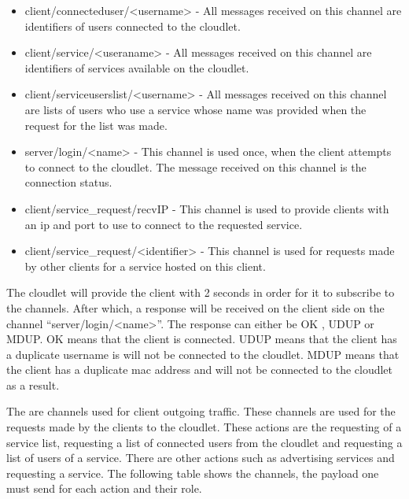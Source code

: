 \begin{itemize}
\itemsep0em
\item client/connecteduser/<username> - All messages received on this channel are identifiers of users connected to the cloudlet.
\item client/service/<useraname> -  All messages received on this channel are identifiers of services available on the cloudlet.
\item client/serviceuserslist/<username> -  All messages received on this channel are lists of users who use a service whose name was provided when the request for the list was made.
\item server/login/<name> - This channel is used once, when the client attempts to connect to the cloudlet. The message received on this channel is the connection status.
\item client/service\_request/recvIP - This channel is used to provide clients with an ip and port to use to connect to the requested service.
\item client/service\_request/<identifier> - This channel is used for requests made by other clients for a service hosted on this client.
\end{itemize}

The cloudlet will provide the client with 2 seconds in order for it to subscribe to the channels. After which, a response will be received on the client side on the channel “server/login/<name>”. The response can either be OK , UDUP or MDUP. OK means that the client is connected. UDUP means that the client has a duplicate username is will not be connected to the cloudlet. MDUP means that the client has a duplicate mac address and will not be connected to the cloudlet as a result.\newline

The are channels used for client outgoing traffic. These channels are used for the requests made by the clients to the cloudlet. These actions are the requesting of a service list, requesting a list of connected users from the cloudlet and requesting a list of users of a service. There are other actions such as advertising services and requesting a service. The following table shows the channels, the payload one must send for each action and their role.

\vspace{10pt}

